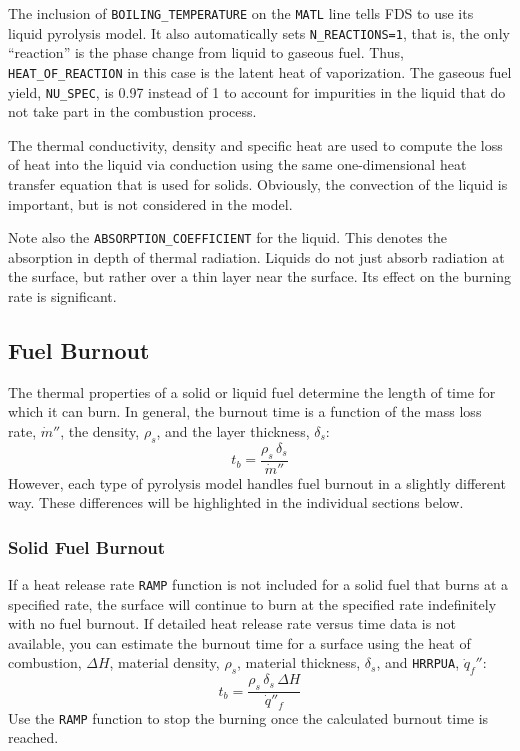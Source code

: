 \documentclass[11pt]{book}
\newcommand{\ct}{\tt\small}
\newcommand{\dq}{\dot{q}}
\newcommand{\dm}{\dot{m}}
\newcommand{\be}{\begin{equation}}
\newcommand{\ee}{\end{equation}}
\begin{document}
\noindent
The inclusion of {\ct BOILING\_TEMPERATURE} on the {\ct MATL} line tells FDS to use its liquid
pyrolysis model. It also automatically sets {\ct N\_REACTIONS=1}, that is, the only ``reaction'' is the
phase change from liquid to gaseous fuel. Thus, {\ct HEAT\_OF\_REACTION} in this case is the latent
heat of vaporization. The gaseous fuel yield, {\ct NU\_SPEC}, is 0.97 instead of 1 to account for
impurities in the liquid that do not take part in the combustion process.

The thermal conductivity, density and specific heat are used to
compute the loss of heat into the liquid via conduction using the
same one-dimensional heat transfer equation that is used for solids. Obviously,
the convection of the liquid is important, but is not considered in
the model.

Note also the {\ct ABSORPTION\_COEFFICIENT} for the liquid. This
denotes the absorption in depth of thermal radiation. Liquids do not
just absorb radiation at the surface, but rather over a thin layer
near the surface. Its effect on the burning rate is significant.

\subsection{Fuel Burnout}

The thermal properties of a solid or liquid fuel determine the length of time for which it can burn. In general, the
burnout time is a function of the mass loss rate, $\dot{m}''$, the density, $\rho_s$, and the
layer thickness, $\delta_s$:
\be t_b = \frac{\rho_s \, \delta_s}{\dm''} \ee
However, each type of pyrolysis model handles fuel burnout in a slightly different way. These differences will be
highlighted in the individual sections below.

\subsubsection{Solid Fuel Burnout}

If a heat release rate {\ct RAMP} function is not included for a solid fuel that burns at a specified rate, the surface will continue to
burn at the specified rate indefinitely with no fuel burnout.  If detailed heat release rate versus time data is not available, you
can estimate the burnout time for a surface using the heat of combustion, $\Delta H$,
material density, $\rho_s$, material thickness, $\delta_s$, and {\ct HRRPUA}, $\dq_f''$:
\be t_{b} = \frac{\rho_s \, \delta_s \, \Delta H}{\dq''_f} \ee
Use the {\ct RAMP} function to stop the burning once the calculated burnout time is reached.
\end{document}
